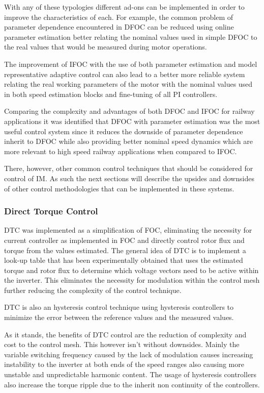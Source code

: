 With any of these typologies different ad-ons can be implemented in order to improve the characteristics of each. For example, the common problem of parameter dependence encountered in DFOC can be reduced using online parameter estimation better relating the nominal values used in simple DFOC to the real values that would be measured during motor operations.

The improvement of IFOC with the use of both parameter estimation and model representative adaptive control can also lead to a better more reliable system relating the real working parameters of the motor with the nominal values used in both speed estimation blocks and fine-tuning of all PI controllers.

Comparing the complexity and advantages of both DFOC and IFOC for railway applications it was identified that DFOC with parameter estimation was the most useful control system since it reduces the downside of parameter dependence inherit to DFOC while also providing better nominal speed dynamics which are more relevant to high speed railway applications when compared to IFOC.

There, however, other common control techniques that should be considered for control of IM. As such the next sections will describe the upsides and downsides of other control methodologies that can be implemented in these systems.
\subsubsection{Direct Torque Control}
DTC was implemented as a simplification of FOC, eliminating the necessity for current controller as implemented in FOC and directly control rotor flux and torque from the values estimated. The general idea of DTC is to implement a look-up table that has been experimentally obtained that uses the estimated torque and rotor flux to determine which voltage vectors need to be active within the inverter. This eliminates the necessity for modulation within the control mesh further reducing the complexity of the control technique. 

DTC is also an hysteresis control technique using hysteresis controllers to minimize the error between the reference values and the measured values.

As it stands, the benefits of DTC control are the reduction of complexity and cost to the control mesh. This however isn't without downsides. Mainly the variable switching frequency caused by the lack of modulation causes increasing instability to the inverter at both ends of the speed ranges also causing more unstable and unpredictable harmonic content. The usage of hysteresis controllers also increase the torque ripple due to the inherit non continuity of the controllers. 

